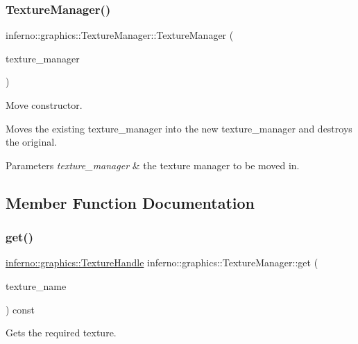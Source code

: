 \subsubsection{\texorpdfstring{Texture\+Manager()}{TextureManager()}\hspace{0.1cm}{\footnotesize\ttfamily [3/3]}}
{\footnotesize\ttfamily inferno\+::graphics\+::\+Texture\+Manager\+::\+Texture\+Manager (\begin{DoxyParamCaption}\item[{\mbox{\hyperlink{classinferno_1_1graphics_1_1_texture_manager}{Texture\+Manager}} \&\&}]{texture\+\_\+manager }\end{DoxyParamCaption})\hspace{0.3cm}{\ttfamily [inline]}}



Move constructor. 

Moves the existing texture\+\_\+manager into the new texture\+\_\+manager and destroys the original. 
\begin{DoxyParams}{Parameters}
{\em texture\+\_\+manager} & the texture manager to be moved in. \\
\hline
\end{DoxyParams}


\subsection{Member Function Documentation}
\mbox{\label{classinferno_1_1graphics_1_1_texture_manager_abdd3884349f80b53a7451fb3cc94dc8d}} 
\subsubsection{\texorpdfstring{get()}{get()}}
{\footnotesize\ttfamily \mbox{\hyperlink{namespaceinferno_1_1graphics_a9d719bfbfedd17b9ace9b8d603ab5a38}{inferno\+::graphics\+::\+Texture\+Handle}} inferno\+::graphics\+::\+Texture\+Manager\+::get (\begin{DoxyParamCaption}\item[{std\+::string}]{texture\+\_\+name }\end{DoxyParamCaption}) const}



Gets the required texture. 

